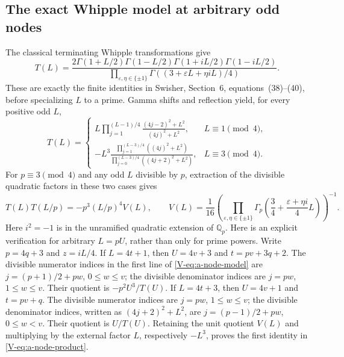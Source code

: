 \documentclass[11pt,letterpaper]{article}
\numberwithin{equation}{section}
\begin{document}
\subsection{The exact Whipple model at arbitrary odd nodes}
The classical terminating Whipple transformations give
\[
 T(L)=\frac{2\Gamma(1+L/2)\Gamma(1-L/2)
 \Gamma(1+iL/2)\Gamma(1-iL/2)}
 {\prod_{\varepsilon,\eta\in\{\pm1\}}
 \Gamma((3+\varepsilon L+\eta iL)/4)}.
\]
These are exactly the finite identities in Swisher, Section~6,
equations~(38)--(40), before specializing $L$ to a prime. Gamma shifts
and reflection yield, for every positive odd $L$,
\begin{equation}\label{V-eq:a-node-model}
 T(L)=\begin{cases}
 L\displaystyle\prod_{j=1}^{(L-1)/4}
       \frac{(4j-2)^2+L^2}{(4j)^2+L^2},&L\equiv1\pmod4,\\[2mm]
 -L^3\displaystyle\frac{\prod_{j=1}^{(L-3)/4}((4j)^2+L^2)}
 {\prod_{j=0}^{(L-3)/4}((4j+2)^2+L^2)},&L\equiv3\pmod4.
 \end{cases}
\end{equation}
For $p\equiv3\pmod4$ and any odd $L$ divisible by $p$, extraction of
the divisible quadratic factors in these two cases gives
\begin{equation}\label{V-eq:a-node-product}
 T(L)T(L/p)=-p^3(L/p)^4V(L),\qquad
 V(L)=\frac1{16}\left(\prod_{\varepsilon,\eta\in\{\pm1\}}
 \Gamma_p\left(\frac34+\frac{\varepsilon+\eta i}{4}L\right)\right)^{-1}.
\end{equation}
Here $i^2=-1$ is in the unramified quadratic extension of $\mathbb Q_p$.
Here is an explicit verification for arbitrary $L=pU$, rather than
only for prime powers. Write $p=4q+3$ and $z=iL/4$. If $L=4t+1$,
then $U=4v+3$ and $t=pv+3q+2$. The divisible numerator indices
in the first line of \eqref{V-eq:a-node-model} are
$j=(p+1)/2+pw$, $0\le w\le v$; the divisible denominator indices
are $j=pw$, $1\le w\le v$. Their quotient is
$-p^2U^3/T(U)$. If $L=4t+3$, then $U=4v+1$ and $t=pv+q$.
The divisible numerator indices are $j=pw$, $1\le w\le v$;
the divisible denominator indices, written as $(4j+2)^2+L^2$,
are $j=(p-1)/2+pw$, $0\le w<v$. Their quotient is $U/T(U)$.
Retaining the unit quotient $V(L)$ and multiplying by the external
factor $L$, respectively $-L^3$, proves the first identity in \eqref{V-eq:a-node-product}.
\end{document}

